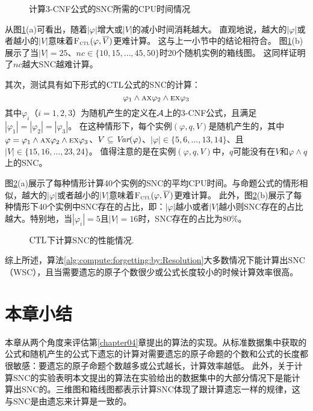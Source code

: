 \begin{figure*}[!htb]
	\centering
	\caption{%
		计算3-CNF公式的SNC所需的CPU时间情况}
	\label{chapter04:fig:ProTime}
\end{figure*}


从图\ref{chapter04:fig:ProTime}(a)可看出，随着$|\varphi|$增大或$|V|$的减小时间消耗越大。
直观地说，越大的$|\varphi|$或者越小的$|V|$意味着${\textsc{F}_{\textsc{ctl}}}(\varphi, \overline{V})$更难计算。
这与上一小节中的结论相符合。
图\ref{chapter04:fig:ProTime}(b)展示了当$|V|= 25$、$nc\in \{10,15,\dots, 45, 50\}$时20个随机实例的箱线图。
这同样证明了$nc$越大SNC越难计算。


其次，测试具有如下形式的$\textrm{CTL}$公式的SNC的计算：
$$\varphi_1 \wedge \textsc{a} \textsc{x} \varphi_2 \wedge \textsc{e}\textsc{x} \varphi_3$$
其中$\varphi_i$（$i=1,2,3$）为随机产生的定义在${\cal A}$上的3-CNF公式，且满足$|\varphi_1|=|\varphi_2|=|\varphi_3|$。
在这种情形下，每个实例$(\varphi, q, V)$是随机产生的，其中$\varphi=\varphi_1 \wedge \textsc{a} \textsc{x} \varphi_2 \wedge \textsc{e}\textsc{x} \varphi_3$、$V\subseteq \textit{Var}(\varphi)$、$|\varphi|\in \{5,6,\dots, 13,14\}$、且$|V|\in \{15,16,\dots, 23,24\}$。
值得注意的是在实例$(\varphi, q, V)$中，$q$可能没有在$V$和$\varphi\wedge q$上的SNC。

图\ref{chapter04:fig:CtlTime}(a)展示了每种情形计算40个实例的SNC的平均CPU时间。与命题公式的情形相似，越大的$|\varphi|$或者越小的$|V|$意味着${\textsc{F}_{\textsc{ctl}}}(\varphi, \overline{V})$更难计算。
此外，图\ref{chapter04:fig:CtlTime}(b)展示了每种情形下40个实例中SNC存在的占比，即：$|\varphi|$越小或者$|V|$越小则SNC存在的占比越大。特别地，当$|\varphi_i|=5$且$|V|=16$时，SNC存在的占比为80\%。



\begin{figure*}[!htb]
	\centering
	\caption{$\textrm{CTL}$下计算SNC的性能情况.}
	\label{chapter04:fig:CtlTime}
\end{figure*}

综上所述，算法\ref{alg:compute:forgetting:by:Resolution}大多数情况下能计算出SNC（WSC），且当需要遗忘的原子个数很少或公式长度较小的时候计算效率很高。

\section{本章小结}\label{sec:chapter06-conclusion}

本章从两个角度来评估第\ref{chapter04}章提出的算法的实现。从标准数据集中获取的公式和随机产生的公式下遗忘的计算对需要遗忘的原子命题的个数和公式的长度都很敏感：要遗忘的原子命题个数越多或公式越长，计算效率越低。
此外，关于计算SNC的实验表明本文提出的算法在实验给出的数据集中的大部分情况下是能计算出SNC的。三维图和箱线图都表示计算SNC体现了跟计算遗忘一样的规律，这与SNC是由遗忘来计算是一致的。
